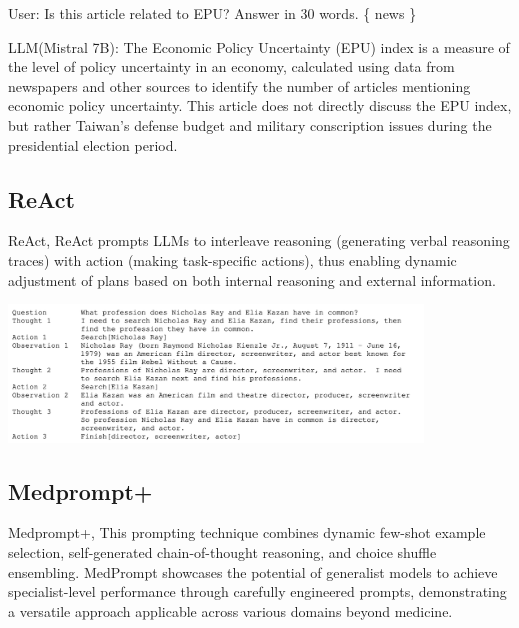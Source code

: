 \documentclass[11.5pt]{beamer}
\begin{document}
\begin{frame}
User: \newline
Is this article related to EPU? Answer in 30 words. \newline
\{ news \} \newline

LLM(Mistral 7B): \newline
The Economic Policy Uncertainty (EPU) index is a measure of the level of
policy uncertainty in an economy, calculated using data from newspapers and
other sources to identify the number of articles mentioning economic policy
uncertainty. This article does not directly discuss the EPU index, but rather
Taiwan's defense budget and military conscription issues during the
presidential election period.
\end{frame}


\subsection{ReAct}
\begin{frame}{ReAct, \cite{Yao2023a}}
ReAct prompts LLMs to interleave reasoning (generating verbal reasoning traces)
with action (making task-specific actions), thus enabling dynamic adjustment
of plans based on both internal reasoning and external information.
\end{frame}


\begin{frame}
\includegraphics[width=11cm]{Figures/fig4.png}
\end{frame}


\subsection{Medprompt+}
\begin{frame}{Medprompt+, \cite{Nori2023}}
This prompting technique combines dynamic few-shot example selection,
self-generated chain-of-thought reasoning, and choice shuffle ensembling.
MedPrompt showcases the potential of generalist models to achieve
specialist-level performance through carefully engineered prompts,
demonstrating a versatile approach applicable across various domains beyond 
medicine.
\end{frame}
\end{document}
